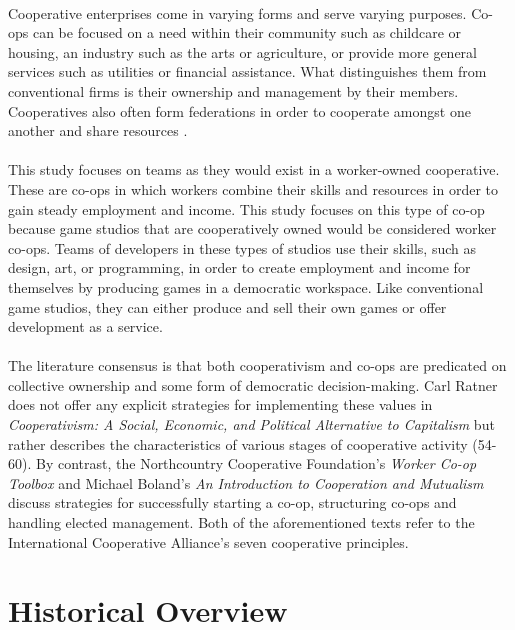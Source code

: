 \paragraph{} Cooperative enterprises come in varying forms and serve varying purposes. Co-ops can be focused on a need within their community such as childcare or housing, an industry such as the arts or agriculture, or provide more general services such as utilities or financial assistance. What distinguishes them from conventional firms is their ownership and management by their members. Cooperatives also often form federations in order to cooperate amongst one another and share resources \autocite{boland_introduction_2017}. 

\paragraph{} This study focuses on teams as they would exist in a worker-owned cooperative. These are co-ops in which workers combine their skills and resources in order to gain steady employment and income. This study focuses on this type of co-op because game studios that are cooperatively owned would be considered worker co-ops. Teams of developers in these types of studios use their skills, such as design, art, or programming, in order to create employment and income for themselves by producing games in a democratic workspace. Like conventional game studios, they can either produce and sell their own games or offer development as a service.

\paragraph{} The literature consensus is that both cooperativism and co-ops are predicated on collective ownership and some form of democratic decision-making. Carl Ratner does not offer any explicit strategies for implementing these values in \textit{Cooperativism: A Social, Economic, and Political Alternative to Capitalism} but rather describes the characteristics of various stages of cooperative activity (54-60). By contrast, the Northcountry Cooperative Foundation's \textit{Worker Co-op Toolbox} and Michael Boland's \textit{An Introduction to Cooperation and Mutualism} discuss strategies for successfully starting a co-op, structuring co-ops and handling elected management. Both of the aforementioned texts refer to the International Cooperative Alliance's seven cooperative principles.

\section{Historical Overview}

